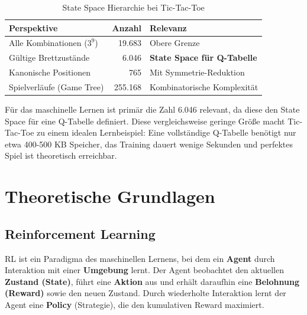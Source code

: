 \begin{table}[H]
\centering
\begin{tabular}{l|r|l}
\textbf{Perspektive} & \textbf{Anzahl} & \textbf{Relevanz} \\
\hline
Alle Kombinationen ($3^9$) & 19.683 & Obere Grenze \\
Gültige Brettzustände & 6.046 & \textbf{State Space für Q-Tabelle} \\
Kanonische Positionen & 765 & Mit Symmetrie-Reduktion \\
Spielverläufe (Game Tree) & 255.168 & Kombinatorische Komplexität \\
\end{tabular}
\caption{State Space Hierarchie bei Tic-Tac-Toe}
\end{table}

Für das maschinelle Lernen ist primär die Zahl 6.046 relevant, da diese den State Space für eine Q-Tabelle definiert. Diese vergleichsweise geringe Größe macht Tic-Tac-Toe zu einem idealen Lernbeispiel: Eine vollständige Q-Tabelle benötigt nur etwa 400-500 KB Speicher, das Training dauert wenige Sekunden und perfektes Spiel ist theoretisch erreichbar.


\section{Theoretische Grundlagen}

\subsection{Reinforcement Learning}

\ac{RL} ist ein Paradigma des maschinellen Lernens, bei dem ein \textbf{Agent} durch Interaktion mit einer \textbf{Umgebung} lernt. Der Agent beobachtet den aktuellen \textbf{Zustand (State)}, führt eine \textbf{Aktion} aus und erhält daraufhin eine \textbf{Belohnung (Reward)} sowie den neuen Zustand. Durch wiederholte Interaktion lernt der Agent eine \textbf{Policy} (Strategie), die den kumulativen Reward maximiert.

